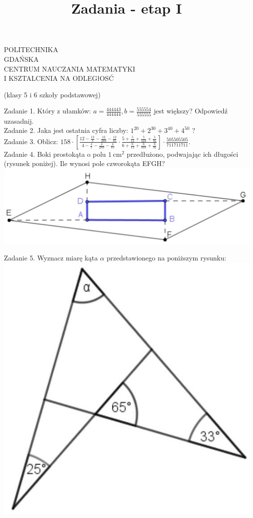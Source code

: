 \documentclass[10pt]{article}
\title{Zadania - etap I }
\author{}
\date{}
\begin{document}
\maketitle
POLITECHNIKA\\
GDAŃSKA\\
CENTRUM NAUCZANIA MATEMATYKI\\
I KSZTALCENIA NA ODLEGłOSĆ

(klasy 5 i 6 szkoły podstawowej)

Zadanie 1. Który z ułamków: \(a=\frac{444443}{444444}, b=\frac{555554}{555555}\) jest większy? Odpowiedź uzasadnij.\\
Zadanie 2. Jaka jest ostatnia cyfra liczby: \(1^{20}+2^{30}+3^{40}+4^{50}\) ?\\
Zadanie 3. Oblicz: \(158 \cdot\left[\frac{12-\frac{12}{7}-\frac{12}{289}-\frac{12}{85}}{4-\frac{4}{7}-\frac{4}{289}-\frac{4}{85}} \cdot \frac{5+\frac{5}{13}+\frac{5}{169}+\frac{5}{91}}{6+\frac{6}{13}+\frac{6}{169}+\frac{6}{91}}\right] \cdot \frac{505505505}{711711711}\).\\
Zadanie 4. Boki prostokąta o polu \(1 \mathrm{~cm}^{2}\) przedłużono, podwajając ich długości (rysunek poniżej). Ile wynosi pole czworokąta EFGH?\\
\includegraphics[max width=\textwidth, center]{2024_11_21_96f6884e2cf0f7ea94b2g-1(1)}

Zadanie 5. Wyznacz miarę kąta \(\alpha\) przedstawionego na poniższym rysunku:\\
\includegraphics[max width=\textwidth, center]{2024_11_21_96f6884e2cf0f7ea94b2g-1}
\end{document}

